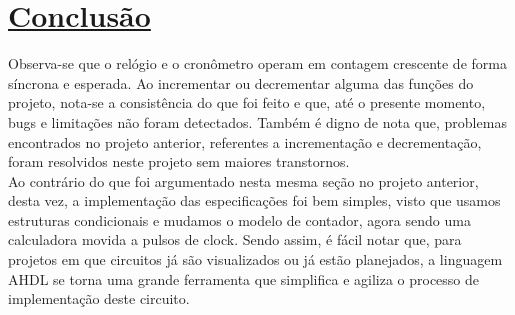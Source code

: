 \documentclass[14pt, oneside]{book}
\newcommand\tab[1][1cm]{\hspace*{#1}}
\theoremstyle{definition}
\begin{document}
        \chapter[Conclusão]{\hyperlink{toc}{Conclusão}}
            \tab Observa-se que o relógio e o cronômetro operam em contagem crescente de forma síncrona e esperada. Ao incrementar ou decrementar alguma das funções do projeto, nota-se a consistência do que foi feito e que, até o presente momento, bugs e limitações não foram detectados. Também é digno de nota que, problemas encontrados no projeto anterior, referentes a incrementação e decrementação, foram resolvidos neste projeto sem maiores transtornos. \\
            \tab Ao contrário do que foi argumentado nesta mesma seção no projeto anterior, desta vez, a implementação das especificações foi bem simples, visto que usamos estruturas condicionais e mudamos o modelo de contador, agora sendo uma calculadora movida a pulsos de clock. Sendo assim, é fácil notar que, para projetos em que circuitos já são visualizados ou já estão planejados, a linguagem AHDL se torna uma grande ferramenta que simplifica e agiliza o processo de implementação deste circuito.
                    
        
        
\end{document}
